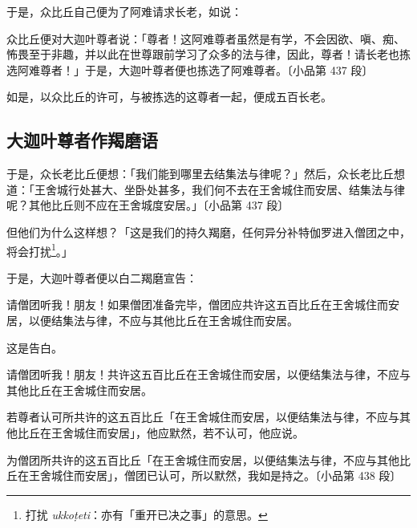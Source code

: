 于是，众比丘自己便为了阿难请求长老，如说：

\begin{quoting}众比丘便对大迦叶尊者说：「尊者！这阿难尊者虽然是有学，不会因欲、嗔、痴、怖畏至于非趣，并以此在世尊跟前学习了众多的法与律，因此，尊者！请长老也拣选阿难尊者！」于是，大迦叶尊者便也拣选了阿难尊者。{\bluefootnotesize 〔小品第 437 段〕}\end{quoting}

如是，以众比丘的许可，与被拣选的这尊者一起，便成五百长老。

\subsection*{大迦叶尊者作羯磨语}

\begin{quoting}于是，众长老比丘便想：「我们能到哪里去结集法与律呢？」然后，众长老比丘想道：「王舍城行处甚大、坐卧处甚多，我们何不去在王舍城住而安居、结集法与律呢？其他比丘则不应在王舍城度安居。」{\bluefootnotesize 〔小品第 437 段〕}\end{quoting}

但他们为什么这样想？「这是我们的持久羯磨，任何异分补特伽罗进入僧团之中，将会打扰\footnote{打扰 \textit{ukkoṭeti}：亦有「重开已决之事」的意思。}。」

于是，大迦叶尊者便以白二羯磨宣告：

\begin{quoting}请僧团听我！朋友！如果僧团准备完毕，僧团应共许这五百比丘在王舍城住而安居，以便结集法与律，不应与其他比丘在王舍城住而安居。\end{quoting}

\begin{quoting}这是告白。\end{quoting}

\begin{quoting}请僧团听我！朋友！共许这五百比丘在王舍城住而安居，以便结集法与律，不应与其他比丘在王舍城住而安居。\end{quoting}

\begin{quoting}若尊者认可所共许的这五百比丘「在王舍城住而安居，以便结集法与律，不应与其他比丘在王舍城住而安居」，他应默然，若不认可，他应说。\end{quoting}

\begin{quoting}为僧团所共许的这五百比丘「在王舍城住而安居，以便结集法与律，不应与其他比丘在王舍城住而安居」，僧团已认可，所以默然，我如是持之。{\bluefootnotesize 〔小品第 438 段〕}\end{quoting}

